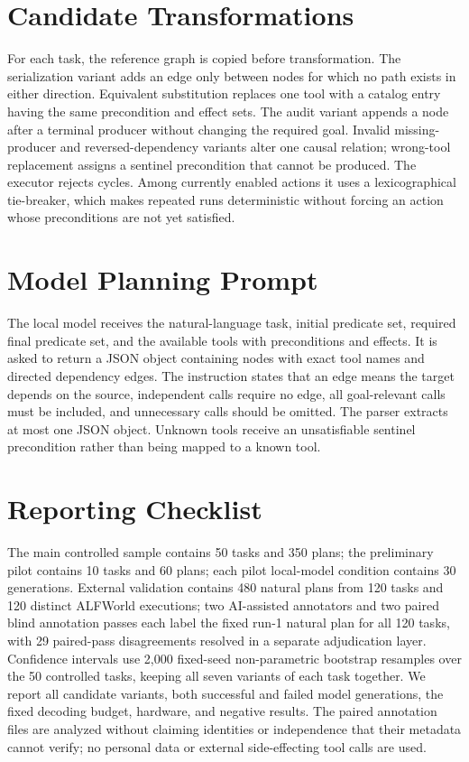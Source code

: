 \documentclass[10pt]{article}
\begin{document}
\section{Candidate Transformations}
For each task, the reference graph is copied before transformation. The
serialization variant adds an edge only between nodes for which no path exists
in either direction. Equivalent substitution replaces one tool with a catalog
entry having the same precondition and effect sets. The audit variant appends
a node after a terminal producer without changing the required goal. Invalid
missing-producer and reversed-dependency variants alter one causal relation;
wrong-tool replacement assigns a sentinel precondition that cannot be produced.
The executor rejects cycles. Among currently enabled actions it uses a
lexicographical tie-breaker, which makes repeated runs deterministic without
forcing an action whose preconditions are not yet satisfied.

\section{Model Planning Prompt}
The local model receives the natural-language task, initial predicate set,
required final predicate set, and the available tools with preconditions and
effects. It is asked to return a JSON object containing nodes with exact tool
names and directed dependency edges. The instruction states that an edge means
the target depends on the source, independent calls require no edge, all
goal-relevant calls must be included, and unnecessary calls should be omitted.
The parser extracts at most one JSON object. Unknown tools receive an
unsatisfiable sentinel precondition rather than being mapped to a known tool.

\section{Reporting Checklist}
The main controlled sample contains 50 tasks and 350 plans; the preliminary
pilot contains 10 tasks and 60 plans; each pilot local-model condition contains
30 generations. External validation contains 480 natural plans from 120 tasks
and 120 distinct ALFWorld executions; two AI-assisted annotators and two paired
blind annotation passes each label the fixed run-1 natural plan for all 120
tasks, with 29 paired-pass disagreements resolved in a separate adjudication
layer. Confidence intervals use 2,000 fixed-seed non-parametric bootstrap
resamples over the 50 controlled tasks, keeping all seven variants of each task
together. We report all candidate variants, both successful and
failed model generations, the fixed decoding budget, hardware, and negative
results. The paired annotation files are analyzed without claiming identities
or independence that their metadata cannot verify; no personal data or
external side-effecting tool calls are used.



\end{document}
